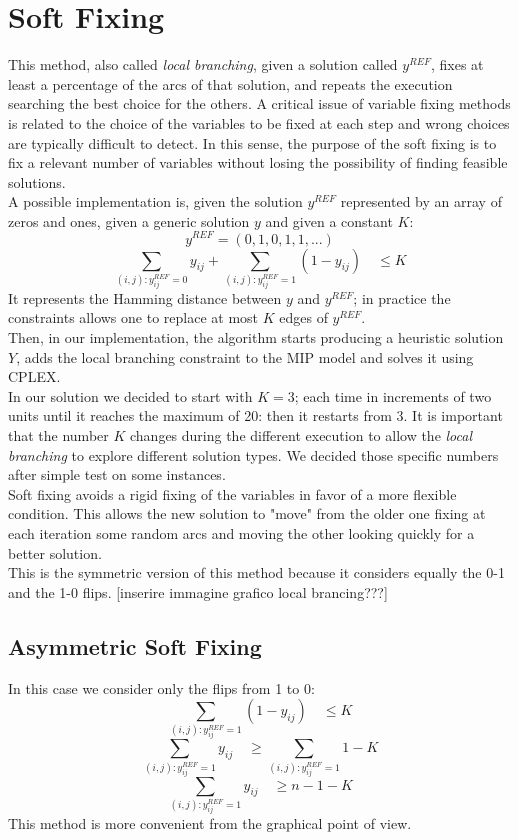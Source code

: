 \section{Soft Fixing}
This method, also called \textit{local branching}, given a solution called $y^{REF}$, fixes at least a percentage of the arcs of that solution, and repeats the execution searching the best choice for the others. A critical issue of variable fixing methods is related to the choice of the variables to be fixed at each step and wrong choices are typically difficult to detect. In this sense, the purpose of the soft fixing is to fix a relevant number of variables without losing the possibility of finding feasible solutions.\\
A possible implementation is, given the solution $y^{REF}$ represented by an array of zeros and ones, given a generic solution $y$ and given a constant $K$:
\[
	y^{REF} = (0,1,0,1,1,...)
\]
\[
	\sum_{(i,j):y^{REF}_{ij}=0} y_{ij} + \sum_{(i,j):y^{REF}_{ij}=1} (1-y_{ij}) \quad \leq K
\]
It represents the Hamming distance between $y$ and $y^{REF}$; in practice the constraints allows one to replace at most $K$ edges of $y^{REF}$. \\
Then, in our implementation, the algorithm starts producing a heuristic solution $Y$, adds the local branching constraint to the MIP model and solves it using \textsc{CPLEX}.\\
In our solution we decided to start with $K=3$; each time in increments of two units until it reaches the maximum of 20: then it restarts from 3. It is important that the number $K$ changes during the different execution to allow the \textit{local branching} to explore different solution types. We decided those specific numbers after simple test on some instances.\\
Soft fixing avoids a rigid fixing of the variables in favor of a more flexible condition. This allows the new solution to "move" from the older one fixing at each iteration some random arcs and moving the other looking quickly for a better solution.\\
This is the symmetric version of this method because it considers equally the 0-1 and the 1-0 flips. 
[inserire immagine grafico local brancing???]
\subsection{Asymmetric Soft Fixing}
In this case we consider only the flips from 1 to 0:
\[
	\sum_{(i,j):y^{REF}_{ij}=1} (1-y_{ij}) \quad \leq K
\]
\[
	\sum_{(i,j):y^{REF}_{ij}=1} y_{ij} \quad \geq \sum_{(i,j):y^{REF}_{ij}=1} 1 - K
\]
\[
	\sum_{(i,j):y^{REF}_{ij}=1} y_{ij} \quad \geq n - 1 - K
\]
This method is more convenient from the graphical point of view. 
